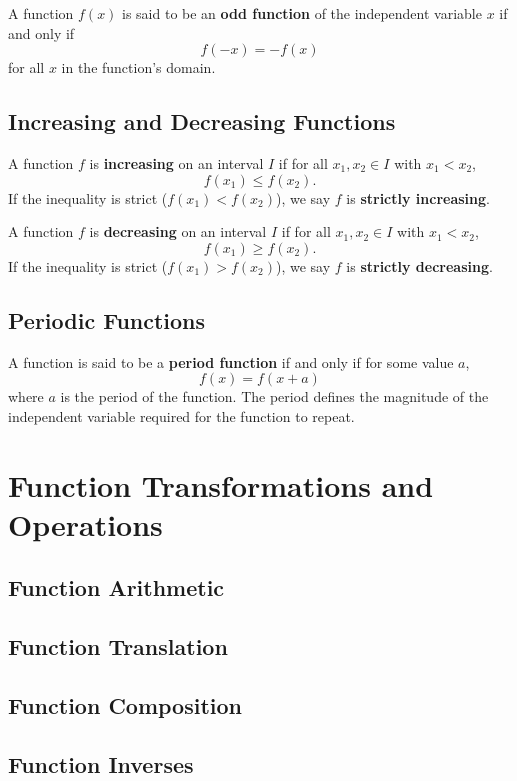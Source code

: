         \begin{definition}
            A function $f(x)$ is said to be an \textbf{odd function} of the independent variable $x$ if and only if
            $$
            f(-x) = -f(x)
            $$
            for all $x$ in the function's domain.
        \end{definition}

        \subsection{Increasing and Decreasing Functions}
        \begin{definition}
            A function $f$ is \textbf{increasing} on an interval $I$ if for all $x_1, x_2 \in I$ with $x_1 < x_2$,
            $$
            f(x_1) \leq f(x_2).
            $$
            If the inequality is strict ($f(x_1) < f(x_2)$), we say $f$ is \textbf{strictly increasing}.
        \end{definition}

        \begin{definition}
            A function $f$ is \textbf{decreasing} on an interval $I$ if for all $x_1, x_2 \in I$ with $x_1 < x_2$,
            $$
            f(x_1) \geq f(x_2).
            $$
            If the inequality is strict ($f(x_1) > f(x_2)$), we say $f$ is \textbf{strictly decreasing}.
        \end{definition}

        \subsection{Periodic Functions}
        \label{sect:periodicfunctions}
        \begin{definition}
            A function is said to be a \textbf{period function} if and only if for some value $a$,
            $$
            f(x) = f(x+a)
            $$
            where $a$ is the period of the function. The period defines the magnitude of the independent variable required for the function to repeat.
        \end{definition}

        \section{Function Transformations and Operations}
        \subsection{Function Arithmetic}
        \subsection{Function Translation}
        \subsection{Function Composition}
        \subsection{Function Inverses}
        \label{sect:function inverses}
